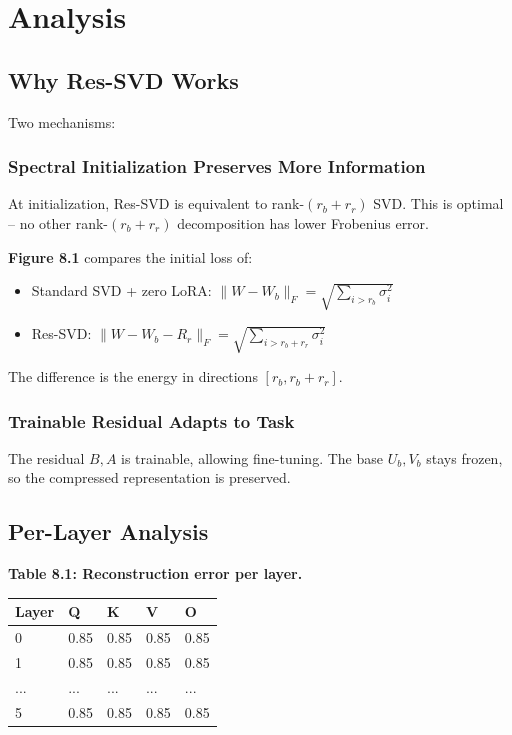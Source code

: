 \section{Analysis}

\subsection{Why Res-SVD Works}

Two mechanisms:

\subsubsection{Spectral Initialization Preserves More Information}

At initialization, Res-SVD is equivalent to rank-$(r_b + r_r)$ SVD. This 
is optimal -- no other rank-$(r_b + r_r)$ decomposition has lower Frobenius 
error.

\textbf{Figure 8.1} compares the initial loss of:
\begin{itemize}
\item Standard SVD + zero LoRA: $\|W - W_b\|_F = \sqrt{\sum_{i > r_b} \sigma_i^2}$
\item Res-SVD: $\|W - W_b - R_r\|_F = \sqrt{\sum_{i > r_b + r_r} \sigma_i^2}$

\end{itemize}
The difference is the energy in directions $[r_b, r_b + r_r]$.

\subsubsection{Trainable Residual Adapts to Task}

The residual $B, A$ is trainable, allowing fine-tuning. The base 
$U_b, V_b$ stays frozen, so the compressed representation is preserved.

\subsection{Per-Layer Analysis}

\textbf{Table 8.1: Reconstruction error per layer.}

\begin{table}[H]
\centering
\small
\begin{tabular}{lllll}
\toprule
\textbf{Layer} & \textbf{Q} & \textbf{K} & \textbf{V} & \textbf{O} \\
\midrule
0 & 0.85 & 0.85 & 0.85 & 0.85 \\
1 & 0.85 & 0.85 & 0.85 & 0.85 \\
... & ... & ... & ... & ... \\
5 & 0.85 & 0.85 & 0.85 & 0.85 \\
\bottomrule
\end{tabular}
\end{table}

